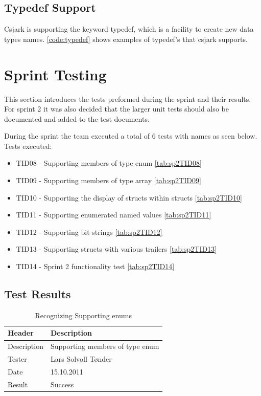 

\subsection{Typedef Support}
Csjark is supporting the keyword typedef, which is a facility to create new 
data types names. \autoref{code:typedef} shows examples of typedef's that 
csjark supports.



\section{Sprint Testing}
This section introduces the tests preformed during the sprint and their results. For sprint 2 it was also decided that the larger unit tests should also be documented and added to the test documents.

During the sprint the team executed a total of 6 tests with names as seen below. Tests executed:
\begin{itemize}
	\item TID08 - Supporting \glspl{member} of type \gls{enum} \autoref{tab:sp2TID08}
	\item TID09 - Supporting \glspl{member} of type \gls{array}  \autoref{tab:sp2TID09}
	\item TID10 - Supporting the display of \glspl{struct} within \glspl{struct}  \autoref{tab:sp2TID10}
	\item TID11 - Supporting \glspl{enumerated named value}  \autoref{tab:sp2TID11}
	\item TID12 - Supporting \glspl{bit string}  \autoref{tab:sp2TID12}
	\item TID13 - Supporting \glspl{struct} with various \gls{trailers} \autoref{tab:sp2TID13}
	\item TID14 - Sprint 2 functionality test \autoref{tab:sp2TID14}
\end{itemize}

\subsection{Test Results}
\begin{table}[!htb] \footnotesize \center
\caption{Recognizing Supporting \glspl{enum} \label{tab:sp2TID08}}
\begin{tabular}{l l}
	\toprule
	Header & Description \\
	\midrule
	Description &  Supporting \glspl{member} of type \gls{enum}  \\
	Tester & Lars Solvoll Tønder \\
	Date & 15.10.2011 \\
	Result & Success\\
	\bottomrule
\end{tabular}
\end{table}

